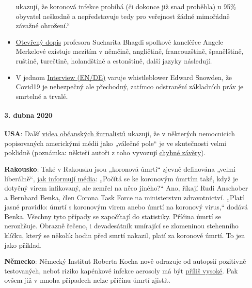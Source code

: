 \begin{itemize}
  ukazují, že koronová infekce probíhá (či dokonce již snad proběhla) u
  95\% obyvatel neškodně a nepředstavuje tedy pro veřejnost žádné
  mimořádně závažné ohrožení.``
\item
  \href{https://swprs.org/offener-brief-von-professor-sucharit-bhakdi-an-bundeskanzlerin-dr-angela-merkel/}{Otevřený
  dopis} profesora Sucharita Bhagdi spolkové kancléřce Angele Merkelové
  existuje mezitím v němčině, angličtině, francouzštině, španělštině,
  ruštině, turečtině, holandštině a estonštině, další jazyky následují.
\item
  V jednom \href{https://www.youtube.com/watch?v=-pcQFTzck_c}{Interview
  (EN/DE)} varuje whistleblower Edward Snowden, že Covid19 je nebezpečný
  ale přechodný, zatímco odstranění základních práv je smrtelné a
  trvalé.
\end{itemize}

\hypertarget{3-dubna-2020}{%
\paragraph{3. dubna 2020}\label{3-dubna-2020}}

\textbf{USA}: Další
\href{https://www.youtube.com/watch?v=5pIMD1enwd4}{videa občanských
žurnalistů} ukazují, že v některých nemocnicích popisovaných americkými
médii jako „válečné pole`` je ve skutečnosti velmi poklidně (poznámka:
někteří autoři z toho vyvozují
\href{https://www.politifact.com/factchecks/2020/apr/03/facebook-posts/hospital-beds-being-kept-empty-prepare-covid-influ/}{chybné
závěry}).

\textbf{Rakousko}: Také v Rakousku jsou „koronová úmrtí`` zjevně
definována „velmi liberálně``,
\href{https://www.heute.at/s/osterreich-bei-corona-todesstatistik-sehr-liberal-48665863}{jak
informují média}: „Počítá se ke koronovým úmrtím také, když je dotyčný
virem infikovaný, ale zemřel na něco jiného?`` Ano, říkají Rudi
Anschober a Bernhard Benka, člen Corona Task Force na ministerstvu
zdravotnictví. „Platí jasné pravidlo: úmrtí s koronovým virem anebo
úmrtí na koronový virus,`` dodává Benka. Všechny tyto případy se
započítají do statistiky. Příčina úmrtí se nerozlišuje. Obrazně řečeno,
i devadesátník umírající se zlomeninou stehenního klíčku, který se
několik hodin před smrtí nakazil, platí za koronové úmrtí. To jen jako
příklad.

\textbf{Německo}: Německý Institut Roberta Kocha nově odrazuje od
autopsií pozitivně testovaných, neboť riziko kapénkové infekce aerosoly
má být \href{https://www.youtube.com/watch?v=gSn_YaOYYcY}{příliš
vysoké}. Pak ovšem již v mnoha případech nelze příčinu úmrtí zjistit.

